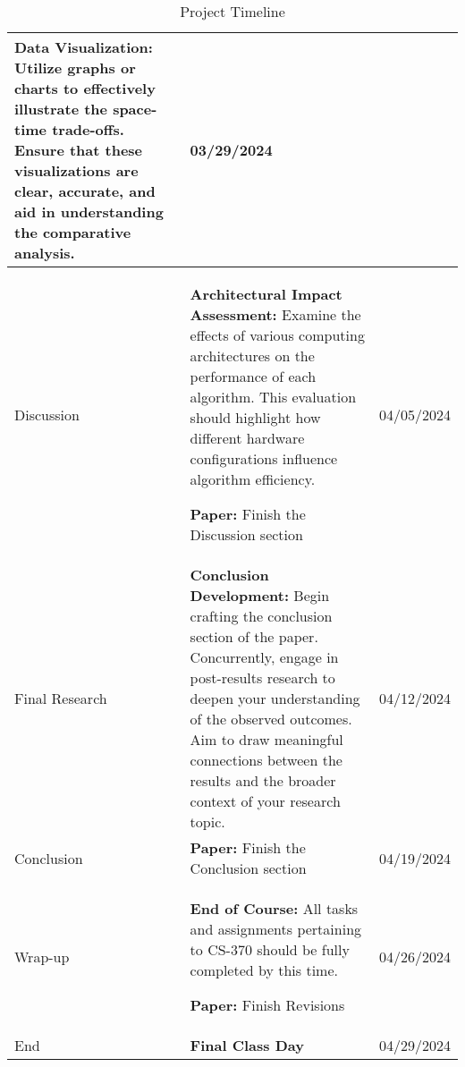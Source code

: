 \documentclass[11pt]{article}
\begin{document}
\begin{table}[h!]
\begin{tabular}{ | m{3cm} | m{10cm}| m{2cm} | }
            \textbf{Data Visualization:} Utilize graphs or charts to effectively illustrate the space-time trade-offs. Ensure that these visualizations are clear, accurate, and aid in understanding the comparative analysis.
        & 03/29/2024 \\

        \hline
        Discussion & 
            \textbf{Architectural Impact Assessment:} Examine the effects of various computing architectures on the performance of each algorithm. This evaluation should highlight how different hardware configurations influence algorithm efficiency.
                    
            \textbf{Paper:} Finish the Discussion section
        & 04/05/2024 \\

        \hline
        Final Research &
        \textbf{Conclusion Development:} Begin crafting the conclusion section of the paper. Concurrently, engage in post-results research to deepen your understanding of the observed outcomes. Aim to draw meaningful connections between the results and the broader context of your research topic.
        & 04/12/2024 \\

        \hline
        Conclusion & 
            \textbf{Paper:} Finish the Conclusion section
        & 04/19/2024 \\

        \hline
        Wrap-up & 
            \textbf{End of Course:} All tasks and assignments pertaining to CS-370 should be fully completed by this time.
            
            \textbf{Paper:} Finish Revisions
        & 04/26/2024 \\
        
        \hline
        End & 
            \textbf{Final Class Day}
        & 04/29/2024 \\
        \hline
        \end{tabular}
    \caption{Project Timeline}
    \label{tab:timeline}
\end{table}
\end{document}
